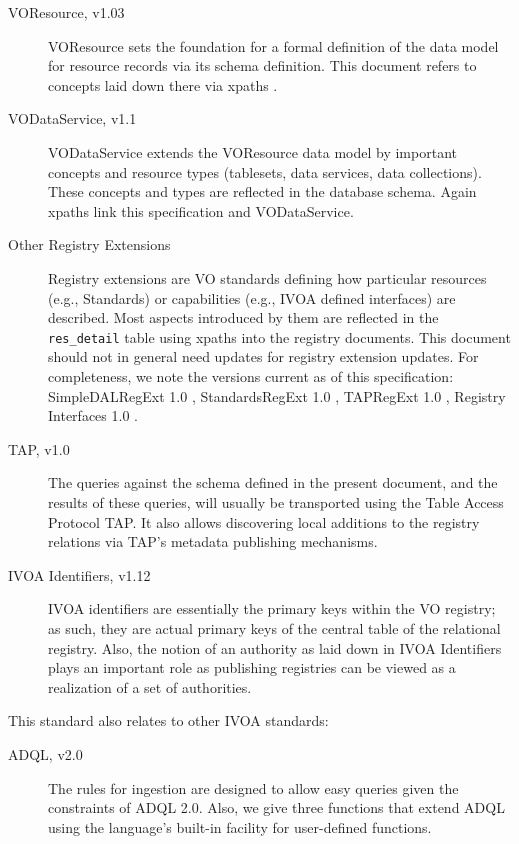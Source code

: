 \documentclass[11pt,a4paper]{ivoa}
\newcommand{\rtent}[1]{\texttt{\color{rtcolor} #1}}
\begin{document}
\begin{description}
\item[VOResource, v1.03 \citep{std:VOR}]VOResource sets the foundation for a formal definition of the data
model for resource records via its schema definition.  This document
refers to concepts laid down there via xpaths \citep{std:XPATH}.
\item[VODataService, v1.1 \citep{std:VODS11}]VODataService extends the VOResource data model by important
concepts and resource types (tablesets, data services, data
collections).  These concepts and types are reflected in the database
schema.  Again xpaths link this specification and VODataService.
\item[Other Registry Extensions]Registry extensions are VO standards
defining how particular resources (e.g., Standards) or capabilities
(e.g., IVOA defined interfaces) are described.  Most aspects
introduced by them are reflected in the \rtent{res\_detail} table using
xpaths into the registry documents.
This document should not in general need updates
for registry extension updates.  For completeness, we note the
versions current as of this specification: SimpleDALRegExt 1.0
\citep{std:DALREGEXT},
StandardsRegExt 1.0 \citep{std:STDREGEXT}, TAPRegExt 1.0
\citep{std:TAPREGEXT}, Registry Interfaces 1.0 \citep{std:RI1}.
\item[TAP, v1.0 \citep{std:TAP}]The queries against the schema defined in the present document, and the results of
these queries, will usually be transported using the Table Access
Protocol TAP.  It also allows discovering
local additions to the registry relations via TAP's metadata publishing
mechanisms.
\item[IVOA Identifiers, v1.12 \citep{std:VOID}]IVOA identifiers are
essentially the primary keys within the VO
registry; as such, they are actual primary keys of the central table of
the relational registry. Also, the notion of an authority as laid down
in IVOA Identifiers plays an important role as publishing registries can
be viewed as a realization of a set of authorities.

\end{description}

This standard also relates to other IVOA standards:


\begin{description}
\item[ADQL, v2.0 \citep{std:ADQL}]The rules for ingestion are designed to allow
easy queries given the constraints of ADQL 2.0.  Also,
we give three functions that extend ADQL using the
language's built-in facility for user-defined functions.
\end{description}
\end{document}
